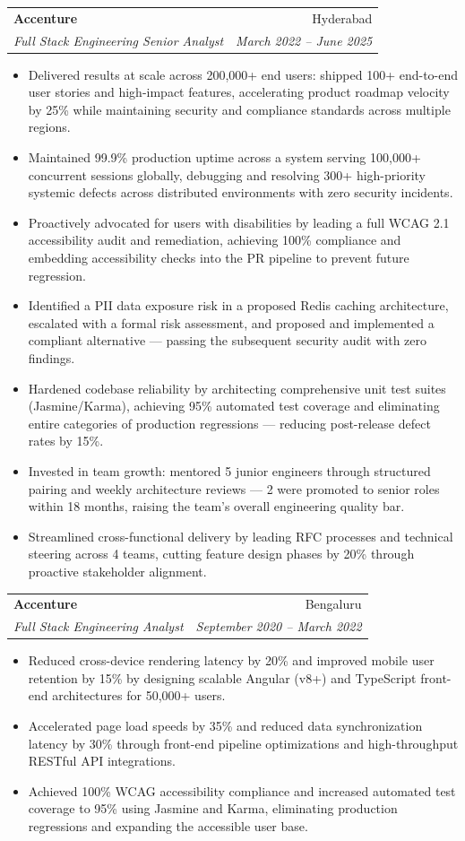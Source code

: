 \documentclass[letterpaper,11pt]{article}
\makeatletter
\newcommand{\resumeItem}[1]{\item\small{{#1 \vspace{-2pt}}}}
\newcommand{\resumeSubheading}[4]{
  \vspace{-2pt}\item
    \begin{tabular*}{0.97\textwidth}[t]{l@{\extracolsep{\fill}}r}
      \textbf{#1} & #2 \\
      \textit{\small#3} & \textit{\small #4} \\
    \end{tabular*}\vspace{-7pt}
}
\newcommand{\resumeItemListStart}{\begin{itemize}}
\newcommand{\resumeItemListEnd}{\end{itemize}\vspace{-5pt}}
\makeatother
\begin{document}
    \resumeSubheading
      {Accenture}{Hyderabad}
      {Full Stack Engineering Senior Analyst}{March 2022 -- June 2025}
      \resumeItemListStart
        \resumeItem{Delivered results at scale across 200,000+ end users: shipped 100+ end-to-end user stories and high-impact features, accelerating product roadmap velocity by 25\% while maintaining security and compliance standards across multiple regions.}
        \resumeItem{Maintained 99.9\% production uptime across a system serving 100,000+ concurrent sessions globally, debugging and resolving 300+ high-priority systemic defects across distributed environments with zero security incidents.}
        \resumeItem{Proactively advocated for users with disabilities by leading a full WCAG 2.1 accessibility audit and remediation, achieving 100\% compliance and embedding accessibility checks into the PR pipeline to prevent future regression.}
        \resumeItem{Identified a PII data exposure risk in a proposed Redis caching architecture, escalated with a formal risk assessment, and proposed and implemented a compliant alternative --- passing the subsequent security audit with zero findings.}
        \resumeItem{Hardened codebase reliability by architecting comprehensive unit test suites (Jasmine/Karma), achieving 95\% automated test coverage and eliminating entire categories of production regressions --- reducing post-release defect rates by 15\%.}
        \resumeItem{Invested in team growth: mentored 5 junior engineers through structured pairing and weekly architecture reviews --- 2 were promoted to senior roles within 18 months, raising the team's overall engineering quality bar.}
        \resumeItem{Streamlined cross-functional delivery by leading RFC processes and technical steering across 4 teams, cutting feature design phases by 20\% through proactive stakeholder alignment.}
      \resumeItemListEnd

    \resumeSubheading
      {Accenture}{Bengaluru}
      {Full Stack Engineering Analyst}{September 2020 -- March 2022}
      \resumeItemListStart
        \resumeItem{Reduced cross-device rendering latency by 20\% and improved mobile user retention by 15\% by designing scalable Angular (v8+) and TypeScript front-end architectures for 50,000+ users.}
        \resumeItem{Accelerated page load speeds by 35\% and reduced data synchronization latency by 30\% through front-end pipeline optimizations and high-throughput RESTful API integrations.}
        \resumeItem{Achieved 100\% WCAG accessibility compliance and increased automated test coverage to 95\% using Jasmine and Karma, eliminating production regressions and expanding the accessible user base.}
      \resumeItemListEnd
\end{document}
